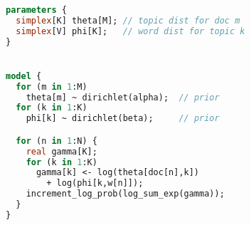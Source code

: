 \documentclass[sigplan,review,10pt,anonymous]{acmart}
\begin{document}
\begin{figure*}
\begin{minipage}[t]{0.49\textwidth}
\begin{lstlisting}[language=Stan]
parameters {
  simplex[K] theta[M]; // topic dist for doc m
  simplex[V] phi[K];   // word dist for topic k
}


model {
  for (m in 1:M)  
    theta[m] ~ dirichlet(alpha);  // prior
  for (k in 1:K)  
    phi[k] ~ dirichlet(beta);     // prior

  for (n in 1:N) {
    real gamma[K];
    for (k in 1:K) 
      gamma[k] <- log(theta[doc[n],k]) 
	  	+ log(phi[k,w[n]]);
    increment_log_prob(log_sum_exp(gamma));
  }
}
\end{lstlisting}
\end{minipage}
\end{figure*}
\end{document}
